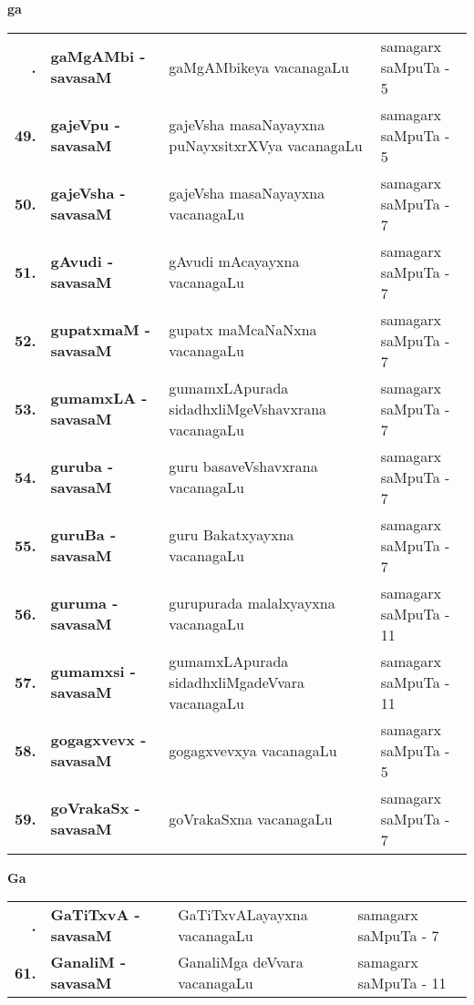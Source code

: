 \centerline{\bf ga}
\medskip

{\renewcommand{\arraystretch}{1.3}
\begin{longtable}{>{\bf}r>{\bf}l>{\raggedright}p{8cm}l}
\endfirsthead
\endhead
\endfoot
\endlastfoot
48. &  gaMgAMbi - savasaM & gaMgAMbikeya vacanagaLu & samagarx saMpuTa - 5\\
49. &  gajeVpu - savasaM & gajeVsha masaNayayxna puNayxsitxrXVya vacanagaLu & samagarx saMpuTa - 5 \\
50. &  gajeVsha - savasaM & gajeVsha masaNayayxna vacanagaLu & samagarx saMpuTa - 7 \\
51. &  gAvudi - savasaM &  gAvudi mAcayayxna vacanagaLu & samagarx saMpuTa - 7 \\
52. &  gupatxmaM - savasaM & gupatx maMcaNaNxna vacanagaLu & samagarx saMpuTa - 7 \\
53. &  gumamxLA - savasaM & gumamxLApurada sidadhxliMgeVshavxrana vacanagaLu & samagarx saMpuTa - 7 \\
54. &  guruba - savasaM & guru basaveVshavxrana vacanagaLu & samagarx saMpuTa - 7 \\
55. &  guruBa - savasaM & guru Bakatxyayxna vacanagaLu & samagarx saMpuTa - 7 \\
56. &  guruma - savasaM & gurupurada malalxyayxna vacanagaLu & samagarx saMpuTa - 11 \\
57. &  gumamxsi - savasaM & gumamxLApurada sidadhxliMgadeVvara vacanagaLu & samagarx saMpuTa - 11 \\
58. & gogagxvevx  - savasaM & gogagxvevxya vacanagaLu & samagarx saMpuTa - 5 \\
59. &  goVrakaSx - savasaM & goVrakaSxna vacanagaLu & samagarx saMpuTa - 7
\end{longtable}}
\smallskip

\centerline{\bf Ga}

{\renewcommand{\arraystretch}{1.3}
\begin{longtable}{>{\bf}r>{\bf}l>{\raggedright}p{8cm}l}
\endfirsthead
\endhead
\endfoot
\endlastfoot
60. &  GaTiTxvA - savasaM & GaTiTxvALayayxna vacanagaLu & samagarx saMpuTa - 7\\
61. &  GanaliM - savasaM & GanaliMga deVvara vacanagaLu & samagarx saMpuTa - 11
\end{longtable}}

\smallskip

